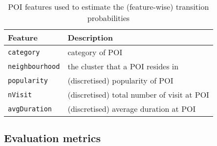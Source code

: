 \begin{table}[ht]
\caption{POI features used to estimate the (feature-wise) transition probabilities}
\label{tab:tranfeature}
\centering
\setlength{\tabcolsep}{2pt} %
\begin{tabular}{l|l} \hline
\textbf{Feature}       & \textbf{Description} \\ \hline
\texttt{category}      & category of POI \\
\texttt{neighbourhood} & the cluster that a POI resides in \\
\texttt{popularity}    & (discretised) popularity of POI \\
\texttt{nVisit}        & (discretised) total number of visit at POI \\
\texttt{avgDuration}  & (discretised) average duration at POI \\ \hline
\end{tabular}
\end{table}



\subsection{Evaluation metrics}
\label{sec:metric}

